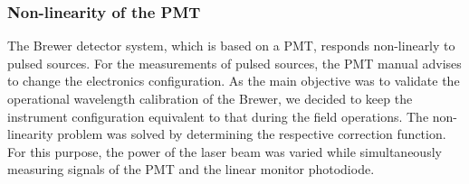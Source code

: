 \documentclass[acp, manuscript]{copernicus}
\begin{document}
\subsubsection{Non-linearity of the PMT }

The Brewer detector system, which is based on a PMT, responds non-linearly to pulsed sources. For the measurements of pulsed sources, the PMT manual advises to change the electronics configuration. As the main objective was to validate the operational wavelength calibration of the Brewer, we decided to keep the instrument configuration equivalent to that during the field operations. The non-linearity problem was solved by determining the respective correction function. For this purpose, the power of the laser beam was varied while simultaneously measuring signals of the PMT and the linear monitor photodiode.
\end{document}
